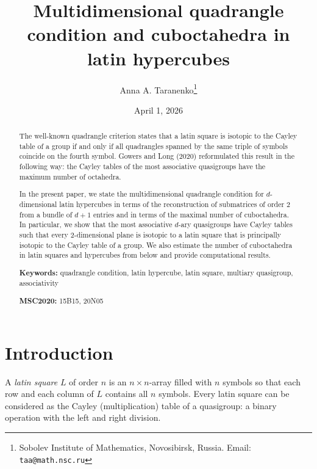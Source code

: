 \documentclass[a4paper]{article}
\begin{document}
\newcommand{\per}{{\rm per}}
\newcommand{\supp}{{\rm supp}}
\newtheorem{theorem}{Theorem}
\newtheorem{lemma}{Lemma}
\newtheorem{utv}{Proposition}
\newtheorem{svoistvo}{Property}
\newtheorem{sled}{Corollary}
\newtheorem{con}{Conjecture}
\newtheorem{zam}{Remark}
\newtheorem{quest}{Question}
\newtheorem{claim}{Claim}


\author{Anna A. Taranenko\thanks{Sobolev Institute of Mathematics,  Novosibirsk, Russia. Email: \texttt{taa@math.nsc.ru}}}
\title{Multidimensional quadrangle condition and cuboctahedra in latin hypercubes}
\date{April 1, 2026}

\maketitle

\begin{abstract}
The well-known quadrangle criterion  states that  a  latin square is  isotopic to  the  Cayley table of  a group if and only if all quadrangles spanned by the same triple of symbols coincide on the fourth symbol.  Gowers and Long (2020) reformulated this result in the following way: the Cayley tables of the most associative quasigroups  have the  maximum  number of octahedra.  


In the present paper, we state the multidimensional quadrangle condition for $d$-dimensional latin hypercubes in terms of the reconstruction of submatrices of order $2$ from a bundle of $d+1$ entries and in terms of the maximal number of cuboctahedra. In particular, we show that  the most associative $d$-ary quasigroups  have Cayley tables such that  every $2$-dimensional plane is isotopic to a latin square that is principally isotopic to the Cayley table of a group. We also estimate the number of cuboctahedra in latin squares and hypercubes from below and provide  computational results.

\textbf{Keywords:} quadrangle condition, latin hypercube, latin square, multiary quasigroup, associativity

\textbf{MSC2020:} 15B15, 20N05
\end{abstract}



\section{Introduction}


A \textit{latin square} $L$ of order $n$ is an $n \times n$-array filled with $n$ symbols so that each row and each column of $L$ contains all $n$ symbols. Every latin square can be considered as the Cayley (multiplication) table of a quasigroup: a binary operation with the left and right division.  
\end{document}
